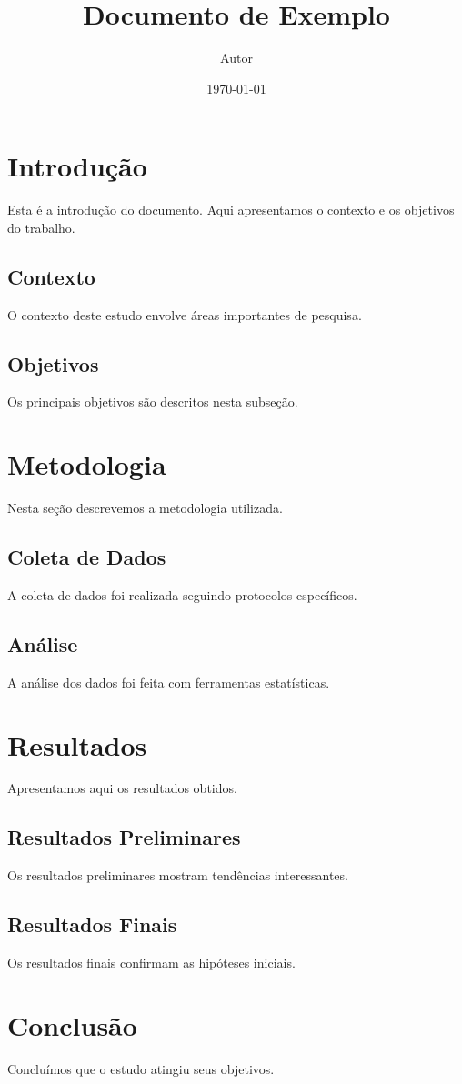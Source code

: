\documentclass{article}
\title{Documento de Exemplo}
\author{Autor}
\date{\today}
\begin{document}
\maketitle

\section{Introdução}
Esta é a introdução do documento. Aqui apresentamos o contexto e os objetivos do trabalho.

\subsection{Contexto}
O contexto deste estudo envolve áreas importantes de pesquisa.

\subsection{Objetivos}
Os principais objetivos são descritos nesta subseção.

\section{Metodologia}
Nesta seção descrevemos a metodologia utilizada.

\subsection{Coleta de Dados}
A coleta de dados foi realizada seguindo protocolos específicos.

\subsection{Análise}
A análise dos dados foi feita com ferramentas estatísticas.

\section{Resultados}
Apresentamos aqui os resultados obtidos.

\subsection{Resultados Preliminares}
Os resultados preliminares mostram tendências interessantes.

\subsection{Resultados Finais}
Os resultados finais confirmam as hipóteses iniciais.

\section{Conclusão}
Concluímos que o estudo atingiu seus objetivos.
\end{document}
